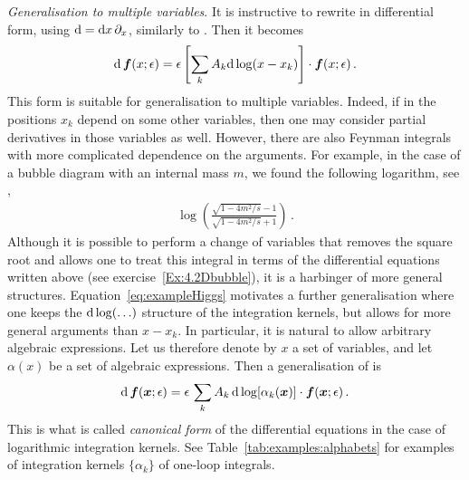 {\it Generalisation to multiple variables}.
It is instructive to rewrite  in differential form, using $\mathrm{d}= \mathrm{d} x \, \partial_x$, similarly to .
Then it becomes
\begin{align}
\label{eq:canonicalDEmanysingularpoints2}
\d\, \vec{f}(x;\eps) = \eps \left[ \sum_k {A_{k}} \d \log({x-x_{k}}) \right] \cdot  \vec{f}(x;\eps) \,.
\end{align}
This form is suitable for generalisation to multiple variables. 
Indeed, if in  the positions $x_{k}$ depend on some other variables, 
then one may consider partial derivatives in those variables as well.
However, there are also Feynman integrals with more complicated dependence on the arguments.
For example, in the case of a bubble diagram with an internal mass $m$,
we found the following logarithm, see ,
\begin{align}\label{eq:exampleHiggs} 
\log \left( \frac{ \sqrt{1-4 m^2/s } -1 }{ \sqrt{1-4 m^2/s } +1} \right) \,.
\end{align}
Although it is possible to perform a change of variables that removes the square root and allows one to treat this integral in terms
of the differential equations written above (see exercise~\ref{Ex:4.2Dbubble}), it is a harbinger of more general structures.
Equation~\eqref{eq:exampleHiggs} motivates a further generalisation where one keeps the $\mathrm{d} \log(\ldots)$ structure of the integration kernels,
but allows for more general arguments than $x-x_k$. In particular, it is natural to allow arbitrary algebraic expressions.
Let us therefore denote by $x$ a set of variables, and let $\alpha(x)$ be a set of algebraic expressions.
Then a generalisation of  is
\begin{align}
\label{eq:canonicalDEmanysingularpointsmultiplevariables}
\d \, \vec{f}(\vec{x};\eps) = \eps \, \sum_k A_{k}  \, \d  \log[ \alpha_k(\vec{x})]  \cdot \vec{f}(\vec{x};\eps) \,.
\end{align}
This is what is called \textit{canonical form} of the differential equations in the case of logarithmic integration kernels.
See Table~\ref{tab:examples:alphabets} for examples of integration kernels $\{ \alpha_k \}$ of one-loop integrals.

